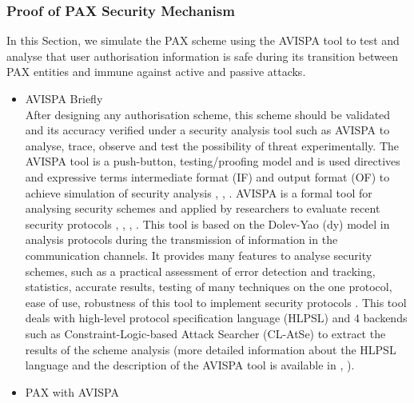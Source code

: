 \documentclass[journal,article,submit,moreauthors,pdftex]{Definitions/mdpi}
\begin{document}
\subsubsection{Proof of PAX Security Mechanism}
In this Section, we simulate the PAX scheme using the AVISPA tool to test and analyse that user authorisation information is safe during its transition between PAX entities and immune against active and passive attacks.
\begin{itemize}
\item AVISPA Briefly\\
After designing any authorisation scheme, this scheme should be validated and its accuracy verified under a security analysis tool such as AVISPA to analyse, trace, observe and test the possibility of threat experimentally. The AVISPA tool is a push-button, testing/proofing model and is used directives and expressive terms intermediate format (IF) and output format (OF) to achieve simulation of security analysis \cite{fp55}, \cite{fp45}, \cite{fp56}.
AVISPA is a formal tool for analysing security schemes and applied by researchers to evaluate recent security protocols \cite{fp46}, \cite{fp47}, \cite{fp48}, \cite{fp57}. This tool is based on the Dolev-Yao (dy) model in analysis protocols during the transmission of information in the communication channels. It provides many features to analyse security schemes, such as a practical assessment of error detection and tracking, statistics, accurate results, testing of many techniques on the one protocol, ease of use, robustness of this tool to implement security protocols \cite{fp45}. This tool deals with high-level protocol specification language (HLPSL) and 4 backends such as Constraint-Logic-based Attack Searcher (CL-AtSe) to extract the results of the scheme analysis (more detailed information about the HLPSL language and the description of the AVISPA tool is available in \cite{fp45}, \cite{fp49} ).
\item PAX with AVISPA\\

\end{itemize}
\end{document}
